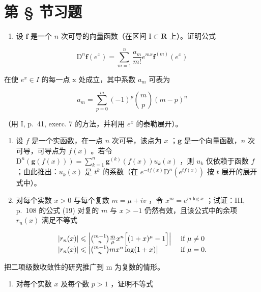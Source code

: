 \section*{第 \S{} 节习题}
{}

\begin{enumerate}
\def\labelenumi{\arabic{enumi})}
\tightlist
\item
  设 \(\mathbf{f}\) 是一个 \(n\) 次可导的向量函数（在区间 \(\mathrm{I} \subset \mathbf{R}\) 上）。证明公式
\end{enumerate}

\[
\mathrm{D} ^ {n} \mathbf {f} \left(e ^ {x}\right) = \sum_ {m = 1} ^ {n} \frac {a _ {m}}{m !} e ^ {m x} \mathbf {f} ^ {(m)} \left(e ^ {x}\right)
\]

在使 \(e^{x} \in I\) 的每一点 x 处成立，其中系数 \(a_{m}\) 可表为

\[
a _ {m} = \sum_ {p = 0} ^ {m} (- 1) ^ {p} \binom {m} {p} (m - p) ^ {n}
\]

（用 I, p.~41, exerc. 7 的方法，并利用 \(e^{x}\) 的泰勒展开）。

\begin{enumerate}
\def\labelenumi{\arabic{enumi})}
\setcounter{enumi}{1}
\item
  设 \(f\) 是一个实函数，在一点 \(n\) 次可导，该点为 \(x\) ；\(\mathbf{g}\) 是一个向量函数，\(n\) 次可导，可导点为 \(f(x)\) 。若令 \(\mathrm{D}^n(\mathbf{g}(f(x))) = \sum_{k=1}^{n} \mathbf{g}^{(k)}(f(x)) u_k(x)\) ，则 \(u_k\) 仅依赖于函数 \(f\) ；由此推出：\(u_k(x)\) 是 \(t^k\) 的系数（在 \(e^{-tf(x)}\mathrm{D}^n(e^{tf(x)})\) 按 \(t\) 展开的展开式中）。
\item
  对每个实数 \(x > 0\) 与每个复数 \(m = \mu + iv\) ，令 \(x^{m} = e^{m\log x}\) ；试证：III, p.~108 的公式 (19) 对复的 \(m\) 与 \(x > -1\) 仍然有效，且该公式中的余项 \(r_{n}(x)\) 满足不等式
\end{enumerate}

\[
\begin{array}{l l} | r _ {n} (x) | \leqslant \left| \binom {m - 1} {n} \frac {m}{\mu} x ^ {n} \Big [ (1 + x) ^ {\mu} - 1 \Big ] \right| & \text { if } \mu \neq 0 \\ | r _ {n} (x) | \leqslant \left| \binom {m - 1} {n} m x ^ {n} \log (1 + x) \right| & \text { if } \mu = 0. \end{array}
\]

把二项级数收敛性的研究推广到 m 为复数的情形。

\begin{enumerate}
\def\labelenumi{\arabic{enumi})}
\setcounter{enumi}{3}
\tightlist
\item
  对每个实数 \(x\) 及每个数 \(p > 1\) ，证明不等式
\end{enumerate}

